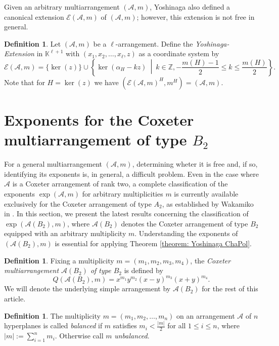\documentclass[12pt]{amsart}
\theoremstyle{definition}
\newtheorem{definition}[theorem]{Definition}
\theoremstyle{remark}
\newcommand\CA{{\mathscr A}}
\newcommand\CE{{\mathscr E}}
\newcommand\KK{{\mathbb K}}
\begin{document}
Given an arbitrary multiarrangement $(\CA,m)$, Yoshinaga also defined a canonical extension $\CE(\CA,m)$ of $(\CA,m)$; however, this extension is not free in general.

\begin{definition}
Let $(\CA,m)$ be a $\ell$-arrangement. Define the \emph{Yoshinaga-Extension} in $\KK^{\ell+1}$
		with $(x_{1},x_{2},\dots,x_\ell,z)$ as a coordinate system by
		$$\CE(\CA,m)=\{\ker(z)\}\cup\left\{\ker(\alpha_H-kz)\ \middle| \  k\in\mathbb{Z},-\frac{m(H)-1}{2}\leq k\leq \frac{m(H)}{2}\right\}.$$
		Note that for $H=\ker(z)$ we have $(\CE(\CA,m)^H,m^H)=(\CA,m)$.
\end{definition} 

\section{Exponents for the Coxeter multiarrangement of type $B_2$}
For a general multiarrangement $(\CA, m)$, determining wheter it is free and, if so, identifying its exponents is, in general, a difficult problem. Even in the case where $\CA$ is a Coxeter arrangement of rank two, a complete classification of the exponents $\exp(\CA, m)$ for arbitrary multiplicities $m$ is currently available exclusively for the Coxeter arrangement of type $A_2$, as established by Wakamiko in \cite{MR2328057}. In this section, we present the latest results concerning the classification of $\exp(\CA(B_2), m)$, where $\CA(B_2)$ denotes the Coxeter arrangement of type $B_2$ equipped with an arbitrary multiplicity $m$. Understanding the exponents of $(\CA(B_2),m)$ is essential for applying Theorem \ref{theorem: Yoshinaga ChaPol}.

\begin{definition}
Fixing a multiplicity $m=(m_1,m_2,m_3,m_4)$, the \emph{Coxeter multiarrangement $\CA(B_2)$ of type $B_2$} is defined by 
$$Q(\CA(B_2),m)=x^{m_1}y^{m_2}(x-y)^{m_3}(x+y)^{m_4}.$$ 
We will denote the underlying simple arrangement by $\CA(B_2)$ for the rest of this article.
\end{definition} 

\begin{definition}
The multiplicity $m=(m_1,m_2,\ldots,m_n)$ on an arrangement $\CA$ of $n$ hyperplanes is called \textit{balanced} if $m$ satisfies $m_i<\frac{\vert m\vert}{2}$ for all $1\leq i\leq n$, where $\vert m\vert:=\sum_{i=1}^{n}m_i$. Otherwise call $m$ \textit{unbalanced}.
\end{definition} 
\end{document}
